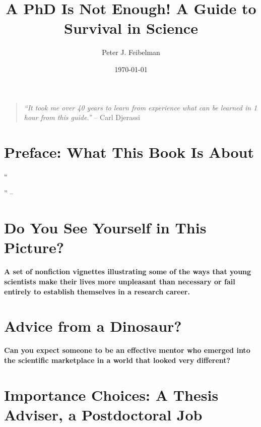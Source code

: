 \documentclass{article}
\title{A PhD Is Not Enough! A Guide to Survival in Science}
\author{Peter J. Feibelman}
\date{\today}
\numberwithin{equation}{section}
\begin{document}
\maketitle
\tableofcontents
\vspace{5mm}
\begin{quotation}
	\textit{``It took me over 40 years to learn from experience what can be learned in 1 hour from this guide.''} -- Carl Djerassi
\end{quotation}


\section*{Preface: What This Book Is About}
``

'' -- \cite{Feibelman2011}


\section{Do You See Yourself in This Picture?}

\begin{center}
	\textsf{\bf A set of nonfiction vignettes illustrating some of the ways that young scientists make their lives more unpleasant than necessary or fail entirely to establish themselves in a research career.}
\end{center}


\section{Advice from a Dinosaur?}

\begin{center}
	\textsf{\bf Can you expect someone to be an effective mentor who emerged into the scientific marketplace in a world that looked very different?}
\end{center}


\section{Importance Choices: A Thesis Adviser, a Postdoctoral Job}
\end{document}
